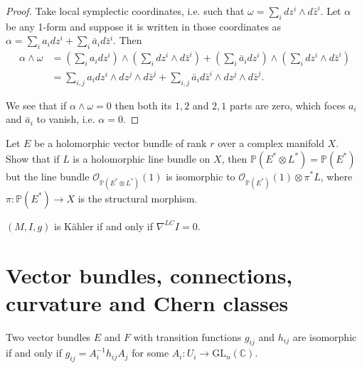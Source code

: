 \begin{proof}
Take local symplectic coordinates, i.e. such that
$\omega = \sum_idz^i \wedge d \bar{z}^i$.
Let $\alpha$ be any 1-form and suppose it is written
in those coordinates as 
$\alpha=\sum_ia_idz^i + \sum_i\bar{a}_id\bar{z}^i$.
Then
\begin{align*}
\alpha\wedge\omega&=
\left(\sum_ia_idz^i\right)
\wedge
\left(\sum_i dz^i \wedge d\bar{z}^i\right) 
+
\left(\sum_i \bar{a}_i dz^i\right) 
\wedge
\left(\sum_i dz^i \wedge d\bar{z}^i\right)\\
&=
\sum_{i,j}a_i dz^i \wedge dz^j \wedge d\bar{z}^j
+
\sum_{i,j}\bar{a}_i d\bar{z}^i \wedge dz^j \wedge d\bar{z}^j.
\end{align*}

\noindent
We see that if $\alpha \wedge \omega=0$
then both its $1,2$ and $2,1$ parts are zero,
which foces $a_i$ and $\bar{a}_i$ to vanish,
i.e. $\alpha=0$.
\end{proof}
\begin{exercise}
\label{exercise-holomorphic-vector-bundles-kahler}
\begin{reference}
\cite[Exercise 2, Chapter 3]{voi}
\end{reference}
Let $E$ be a holomorphic vector bundle of rank $r$
over a complex manifold $X$.
Show that if $L$ is a holomorphic line bundle on $X$,
then $\mathbb{P}(E^* \otimes L^*)= \mathbb{P}(E^*)$
but the line bundle $\mathcal{O}_{\mathbb{P}(E^*\otimes L^*)}(1)$
is isomorphic to
$\mathcal{O}_{\mathbb{P}(E^*)}(1) \otimes \pi^*L$,
where $\pi:\mathbb{P}(E^*)\to X$ is the structural morphism.
\end{exercise}

\begin{exercise}
\label{exercise-kahler-iff-i-parallel}
$(M,I,g)$ is Kähler if and only if $\nabla^{LC}I=0$.
\end{exercise}










\section{Vector bundles, connections, curvature and Chern classes}
\label{section-vector-bundles}

\begin{proposition}
\label{proposition-isomorphism-of-vector-bundles}
\begin{reference}
\cite[Proposition 3.7]{lec}
\end{reference}
Two vector bundles $E$ and $F$ 
with transition functions $g_{ij}$ and $h_{ij}$
are isomorphic if and only if
$g_{ij}=A^{-1}_ih_{ij}A_j$
for some $A_i:U_i \to \text{GL}_n(\mathbb{C})$.
\end{proposition}

